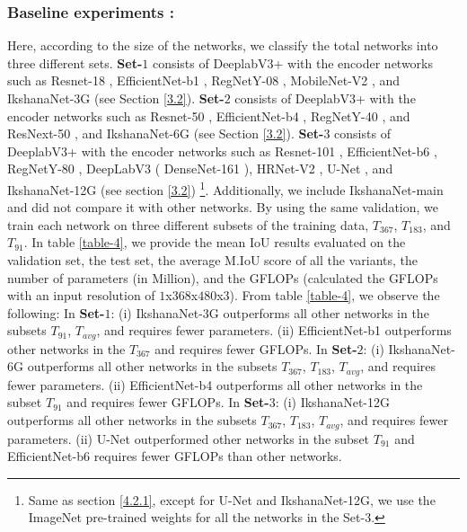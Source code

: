 \documentclass{article}
\begin{document}
\subsubsection{Baseline experiments :}
\label{4.3.1}
Here, according to the size of the networks, we classify the total networks into three different sets. \newline
\textbf{Set-$1$} consists of DeeplabV3+ \cite{chen2018encoder} with the encoder networks such as Resnet-18 \cite{he2016deep}, EfficientNet-b1 \cite{TanL19}, RegNetY-08 \cite{RegNet}, MobileNet-V2 \cite{mobileNetV2}, and IkshanaNet-3G (see Section \ref{3.2}). \newline
\textbf{Set-$2$} consists of  DeeplabV3+ \cite{chen2018encoder} with the encoder networks such as Resnet-50 \cite{he2016deep}, EfficientNet-b4 \cite{TanL19}, RegNetY-40 \cite{RegNet}, and ResNext-50 \cite{Resnext}, and IkshanaNet-6G (see Section \ref{3.2}). \newline
\textbf{Set-$3$} consists of DeeplabV3+ \cite{chen2018encoder} with the encoder networks such as Resnet-101 \cite{he2016deep}, EfficientNet-b6 \cite{TanL19}, RegNetY-80 \cite{RegNet},  DeepLabV3 ( DenseNet-161 \cite{huang2017densely}), HRNet-V2 \cite{SunZJCXLMWLW19}, U-Net \cite{ronneberger2015u}, and IkshanaNet-12G (see section \ref{3.2}) \footnote{Same as section \ref{4.2.1}, except for U-Net \cite{ronneberger2015u} and IkshanaNet-12G, we use the ImageNet \cite{deng2009imagenet} pre-trained weights for all the networks in the Set-$3$.}.\newline
Additionally, we include IkshanaNet-main and did not compare it with other networks. By using the same validation, we train each network on three different subsets of the training data, $T_{367}$, $T_{183}$, and $T_{91}$.\newline
In table \ref{table-4}, we provide the mean IoU results evaluated on the validation set, the test set, the average M.IoU score of all the variants, the number of parameters (in Million), and the GFLOPs \cite{GFLOPS}  (calculated the GFLOPs with an input resolution of $1$x$368$x$480$x$3$). From table  \ref{table-4}, we observe the following:\newline
In \textbf{Set-$1$}: (i) IkshanaNet-$3$G outperforms all other networks in the subsets $T_{91}$,  $T_{avg}$, and requires fewer parameters.\newline
(ii) EfficientNet-b1 \cite{TanL19} outperforms other networks in the $T_{367}$ and requires fewer GFLOPs. \newline
In \textbf{Set-$2$}: (i) IkshanaNet-6G outperforms all other networks in the subsets $T_{367}$, $T_{183}$, $T_{avg}$, and requires fewer parameters. \newline
(ii) EfficientNet-b4 \cite{TanL19} outperforms all other networks in the subset $T_{91}$ and requires fewer GFLOPs.\newline
In \textbf{Set-$3$}: (i) IkshanaNet-12G outperforms all other networks in the subsets $T_{367}$, $T_{183}$, $T_{avg}$, and requires fewer parameters. \newline
(ii) U-Net \cite{ronneberger2015u} outperformed other networks in the  subset $T_{91}$ and  EfficientNet-b6 \cite{TanL19} requires fewer GFLOPs than other networks.
\end{document}
